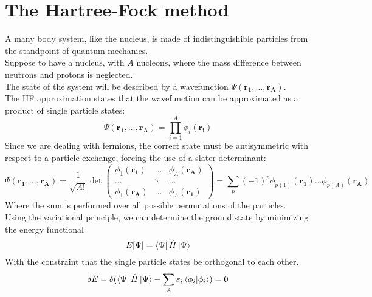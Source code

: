 \section{The Hartree-Fock method}
A many body system, like the nucleus, is made of indistinguishible particles from the standpoint of quantum mechanics.
\\Suppose to have a nucleus, with $A$ nucleons, where the mass difference between neutrons and protons is neglected.
\\The state of the system will be described by a wavefunction $\Psi(\mathbf{r_1}, \ldots, \mathbf{r_A})$.
\\The HF approximation states that the wavefunction can be approximated as a product of single particle states:
\begin{equation}
    \Psi(\mathbf{r_1}, \ldots, \mathbf{r_A}) = \prod_{i=1}^A \phi_i(\mathbf{r_i})
\end{equation}
Since we are dealing with fermions, the correct state must be antisymmetric with respect to a particle exchange, forcing the use of a slater determinant:
\begin{equation}
    \Psi(\mathbf{r_1}, \ldots, \mathbf{r_A}) = \frac{1}{\sqrt{A!}}\det
    \begin{pmatrix}
        \phi_1(\mathbf{r_1}) & \ldots & \phi_A(\mathbf{r_A}) \\
        \ldots & \ddots & \ldots \\
        \phi_1(\mathbf{r_A}) & \ldots & \phi_A(\mathbf{r_1})
    \end{pmatrix}
    =\sum_{p} (-1)^p \phi_{p(1)}(\mathbf{r_1}) \ldots \phi_{p(A)}(\mathbf{r_A})
\end{equation}
Where the sum is performed over all possible permutations of the particles.
\\Using the variational principle, we can determine the ground state by minimizing the energy functional
\begin{equation}
    E[\Psi] = \bra{\Psi} \hat{H} \ket{\Psi}
\end{equation}
With the constraint that the single particle states be orthogonal to each other.
\begin{equation}
    \delta E = \delta(\bra{\Psi} \hat{H} \ket{\Psi} - \sum_A \varepsilon_i\braket{\phi_i | \phi_i} ) = 0
\end{equation}
